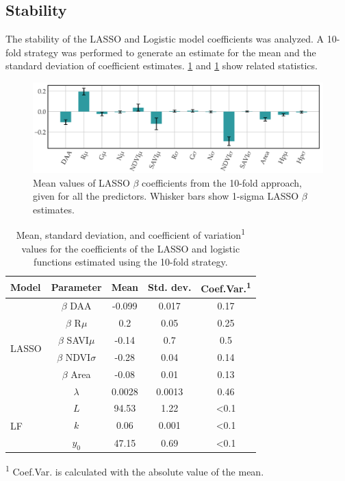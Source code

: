 \documentclass[12pt,a4paper,oneside]{report}
\begin{document}
\subsection{Stability}

The stability of the LASSO and Logistic model coefficients was analyzed. A 10-fold 
strategy was performed to generate an estimate for the mean and the standard deviation of coefficient estimates. 
\cref{fig:stability} and \cref{tab:LASSO} show related statistics.

\begin{figure}[H]
    \centering
    \includegraphics[width=\textwidth]{Images/agronomy-14-00306-g007}
    \caption{Mean values of LASSO $\beta$ coefficients from the 10-fold approach, given for all the predictors. Whisker bars show 1-sigma LASSO $\beta$ estimates.}
    \label{fig:stability}
\end{figure}

\begin{table}[H]
    \centering
    \caption{Mean, standard deviation, and coefficient of variation\textsuperscript{1} values for the coefficients of the LASSO and logistic functions estimated using the 10-fold strategy.}
    \begin{tabular}{lcccc}
    \toprule
    \textbf{Model} & \textbf{Parameter} & \textbf{Mean} & \textbf{Std. dev.} & \textbf{Coef.Var.\textsuperscript{1}} \\
    \midrule
    \multirow{6}{*}{LASSO} & $\beta$ DAA & -0.099 & 0.017 & 0.17 \\
    & $\beta$ R$\mu$ & 0.2 & 0.05 & 0.25 \\
    & $\beta$ SAVI$\mu$ & -0.14 & 0.7 & 0.5 \\
    & $\beta$ NDVI$\sigma$ & -0.28 & 0.04 & 0.14 \\
    & $\beta$ Area & -0.08 & 0.01 & 0.13 \\
    & $\lambda$ & 0.0028 & 0.0013 & 0.46 \\
    \midrule
    \multirow{3}{*}{LF} & $L$ & 94.53 & 1.22 & <0.1 \\
    & $k$ & 0.06 & 0.001 & <0.1 \\
    & $y_0$ & 47.15 & 0.69 & <0.1 \\
    \bottomrule
    \end{tabular}
    \label{tab:LASSO}
    \begin{tablenotes}
    \item[1] \footnotesize{\textsuperscript{1} Coef.Var. is calculated with the absolute value of the mean.}
    \end{tablenotes}
\end{table}
\end{document}
